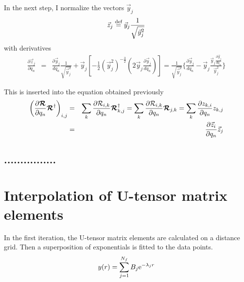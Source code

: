 \documentclass[11pt,a4paper]{report}
\begin{document}
In the next step, I normalize the vectors $\vec{y}_j$
\begin{eqnarray}
\vec{z}_j\stackrel{\text{def}}{=}\vec{y}_j\frac{1}{\sqrt{\vec{y}_j^2}}
\end{eqnarray}
with derivatives
\begin{eqnarray}
\frac{\partial\vec{z}_j}{\partial q_n}
&=&
\frac{\partial\vec{y}_j}{dq_n}\frac{1}{\sqrt{\vec{y}_j^2}}
+
\vec{y}_j\left[-\frac{1}{2}(\vec{y}_j^2)^{-\frac{3}{2}}
\left(2\vec{y}_j\frac{\partial\vec{y}_j}{dq_n}\right)\right]
%
%
=
\frac{1}{\sqrt{\vec{y}_j^2}}
\biggl\{
\frac{\partial\vec{y}_j}{dq_n}
-
\vec{y}_j\frac{\vec{y}_j\frac{\partial\vec{y}_j}{dq_n}}{\vec{y}_j^2}
\biggr\}
\end{eqnarray}

This is inserted into the equation obtained previously
\begin{eqnarray}
\left(
\frac{\partial\bm{\mathcal{R}}}{\partial q_n}\bm{\mathcal{R}}^\dagger
\right)_{i,j}
&=&
\sum_k
\frac{\partial\mathcal{R}_{i,k}}{\partial q_n}\bm{\mathcal{R}}^\dagger_{k,j}
=
\sum_k
\frac{\partial\mathcal{R}_{i,k}}{\partial q_n}\bm{\mathcal{R}}_{j,k}
=
\sum_k
\frac{\partial{z}_{k,i}}{\partial q_n}z_{k,j}
\nonumber\\
&=&
\frac{\partial\vec{z}_i}{\partial q_n}\vec{z}_{j}
\nonumber\\
\end{eqnarray}


\section{................}



\chapter{Interpolation of U-tensor matrix elements}

In the first iteration, the U-tensor matrix elements are calculated on
a distance grid. Then a superposition of exponentials is fitted to the
data points.
\begin{eqnarray}
y(r)=\sum_{j=1}^{N_f} B_j\mathrm{e}^{-\lambda_jr}
\end{eqnarray}
\end{document}
